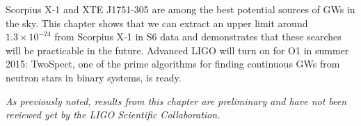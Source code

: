 
Scorpius X-1 and XTE J1751-305 are among the best potential sources of GWs in the sky.
This chapter shows that we can extract an upper limit around $1.3\times10^{-24}$ from Scorpius X-1 in S6 data and demonstrates that these searches will be practicable in the future.
Advanced LIGO will turn on for O1 in summer 2015: TwoSpect, one of the prime algorithms for finding continuous GWs from neutron stars in binary systems, is ready.

\textit{As previously noted, results from this chapter are preliminary and have not been reviewed yet by the LIGO Scientific Collaboration.}






